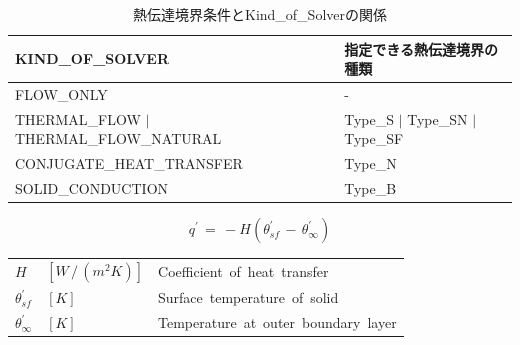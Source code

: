 \begin{table}[htdp]
\caption{熱伝達境界条件とKind\_of\_Solverの関係}
\begin{center}
\small
\begin{tabular}{ll} \toprule
KIND\_OF\_SOLVER & 指定できる熱伝達境界の種類\\ \midrule
FLOW\_ONLY & -\\
THERMAL\_FLOW $|$ THERMAL\_FLOW\_NATURAL & Type\_S $|$ Type\_SN $|$ Type\_SF\\
CONJUGATE\_HEAT\_TRANSFER & Type\_N\\
SOLID\_CONDUCTION & Type\_B\\ \bottomrule
\end{tabular}
\end{center}
\label{tbl:type of HT}
\end{table}


\begin{equation}
q^{\prime} \,=\, -H(\theta_{sf}^{\prime}\,-\,\theta_{\infty}^{\prime})
\label{eq:ht form}
\end{equation}

\begin{center}
\begin{tabular}{lll}
$H$ &  $[W\,/\,(m^2K)]$ & Coefficient\, of\, heat\, transfer\\
$\theta_{sf}^{\prime}$ & $[K]$ & Surface\, temperature\, of\, solid\\
$\theta_{\infty}^{\prime}$ & $[K]$ & Temperature\, at\, outer\, boundary\, layer\\
\end{tabular}
\end{center}

